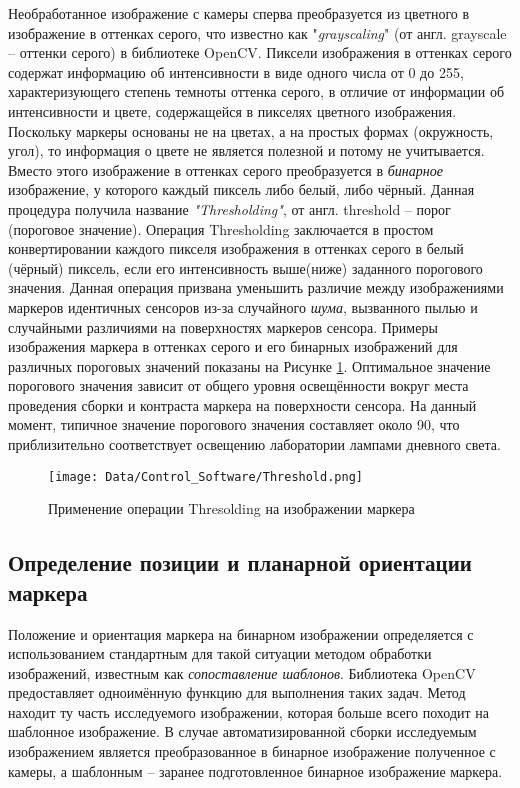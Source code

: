 Необработанное изображение с камеры сперва преобразуется из цветного в изображение в оттенках серого, что известно как "\emph{grayscaling}" (от англ. grayscale -- оттенки серого) в библиотеке OpenCV. Пиксели изображения в оттенках серого содержат информацию об интенсивности в виде одного числа от 0 до 255, характеризующего степень темноты оттенка серого, в отличие от информации об интенсивности и цвете, содержащейся в пикселях цветного изображения. Поскольку маркеры основаны не на цветах, а на простых формах (окружность, угол), то информация о цвете не является полезной и потому не учитывается. Вместо этого изображение в оттенках серого преобразуется в \emph{бинарное} изображение, у которого каждый пиксель либо белый, либо чёрный. Данная процедура получила название \emph{"Thresholding"}, от англ. threshold -- порог (пороговое значение). Операция Thresholding заключается в простом конвертировании каждого пикселя изображения в оттенках серого в белый (чёрный) пиксель, если его интенсивность выше(ниже)  заданного порогового значения. Данная операция призвана уменьшить различие между изображениями маркеров идентичных сенсоров из-за случайного \emph{шума}, вызванного пылью и случайными различиями на поверхностях маркеров сенсора. Примеры изображения маркера в оттенках серого и его бинарных изображений для различных пороговых значений показаны на Рисунке \ref{fig:threshold}. Оптимальное значение порогового значения зависит от общего уровня освещённости вокруг места проведения сборки и контраста маркера на поверхности сенсора. На данный момент, типичное значение порогового значения составляет около 90, что приблизительно соответствует освещению лаборатории лампами дневного света.

\begin{figure}[ht]\centering
\texttt{[image: Data/Control\_Software/Threshold.png]}
\caption{Применение операции Thresolding на изображении маркера}
\label{fig:threshold}
\end{figure}

\subsection{Определение позиции и планарной ориентации маркера}

Положение и ориентация маркера на бинарном изображении определяется с использованием стандартным для такой ситуации методом обработки изображений, известным как \emph{сопоставление шаблонов}. Библиотека OpenCV предоставляет одноимённую функцию для выполнения таких задач. Метод находит ту часть исследуемого изображении, которая больше всего походит на шаблонное изображение. В случае автоматизированной сборки исследуемым изображением является преобразованное в бинарное изображение полученное с камеры, а шаблонным -- заранее подготовленное бинарное изображение маркера. 

